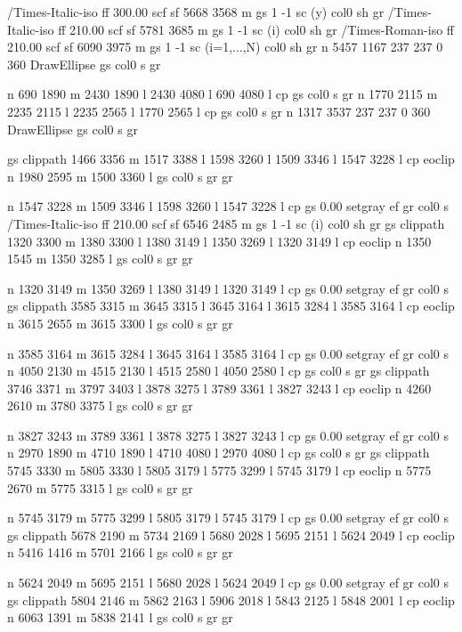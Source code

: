 /Times-Italic-iso ff 300.00 scf sf
5668 3568 m
gs 1 -1 sc (y) col0 sh gr
/Times-Italic-iso ff 210.00 scf sf
5781 3685 m
gs 1 -1 sc (i) col0 sh gr
/Times-Roman-iso ff 210.00 scf sf
6090 3975 m
gs 1 -1 sc (i=1,...,N) col0 sh gr
n 5457 1167 237 237 0 360 DrawEllipse gs col0 s gr

n 690 1890 m 2430 1890 l 2430 4080 l 690 4080 l
 cp gs col0 s gr 
n 1770 2115 m 2235 2115 l 2235 2565 l 1770 2565 l
 cp gs col0 s gr 
n 1317 3537 237 237 0 360 DrawEllipse gs col0 s gr

gs  clippath
1466 3356 m 1517 3388 l 1598 3260 l 1509 3346 l 1547 3228 l cp
eoclip
n 1980 2595 m
 1500 3360 l gs col0 s gr gr

n 1547 3228 m 1509 3346 l 1598 3260 l 1547 3228 l  cp gs 0.00 setgray ef gr  col0 s
/Times-Italic-iso ff 210.00 scf sf
6546 2485 m
gs 1 -1 sc (i) col0 sh gr
gs  clippath
1320 3300 m 1380 3300 l 1380 3149 l 1350 3269 l 1320 3149 l cp
eoclip
n 1350 1545 m
 1350 3285 l gs col0 s gr gr

n 1320 3149 m 1350 3269 l 1380 3149 l 1320 3149 l  cp gs 0.00 setgray ef gr  col0 s
gs  clippath
3585 3315 m 3645 3315 l 3645 3164 l 3615 3284 l 3585 3164 l cp
eoclip
n 3615 2655 m
 3615 3300 l gs col0 s gr gr

n 3585 3164 m 3615 3284 l 3645 3164 l 3585 3164 l  cp gs 0.00 setgray ef gr  col0 s
n 4050 2130 m 4515 2130 l 4515 2580 l 4050 2580 l
 cp gs col0 s gr 
gs  clippath
3746 3371 m 3797 3403 l 3878 3275 l 3789 3361 l 3827 3243 l cp
eoclip
n 4260 2610 m
 3780 3375 l gs col0 s gr gr

n 3827 3243 m 3789 3361 l 3878 3275 l 3827 3243 l  cp gs 0.00 setgray ef gr  col0 s
n 2970 1890 m 4710 1890 l 4710 4080 l 2970 4080 l
 cp gs col0 s gr 
gs  clippath
5745 3330 m 5805 3330 l 5805 3179 l 5775 3299 l 5745 3179 l cp
eoclip
n 5775 2670 m
 5775 3315 l gs col0 s gr gr

n 5745 3179 m 5775 3299 l 5805 3179 l 5745 3179 l  cp gs 0.00 setgray ef gr  col0 s
gs  clippath
5678 2190 m 5734 2169 l 5680 2028 l 5695 2151 l 5624 2049 l cp
eoclip
n 5416 1416 m
 5701 2166 l gs col0 s gr gr

n 5624 2049 m 5695 2151 l 5680 2028 l 5624 2049 l  cp gs 0.00 setgray ef gr  col0 s
gs  clippath
5804 2146 m 5862 2163 l 5906 2018 l 5843 2125 l 5848 2001 l cp
eoclip
n 6063 1391 m
 5838 2141 l gs col0 s gr gr

